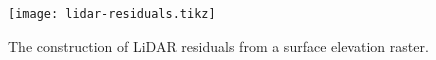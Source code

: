 \begin{figure}
  \centering
  \texttt{[image: lidar-residuals.tikz]}
  \caption{%
    The construction of LiDAR residuals from a surface elevation raster.
  }%
  \label{fig:lidar-residuals}
\end{figure}
%
